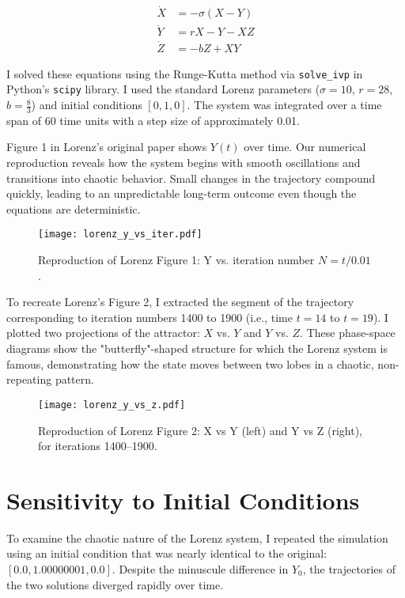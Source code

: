 \documentclass[12pt]{article}
\begin{document}
\[
\begin{aligned}
\dot{X} &= -\sigma(X - Y) \\
\dot{Y} &= rX - Y - XZ \\
\dot{Z} &= -bZ + XY
\end{aligned}
\]

I solved these equations using the Runge-Kutta method via \texttt{solve\_ivp} in Python’s \texttt{scipy} library. I used the standard Lorenz parameters (\( \sigma = 10 \), \( r = 28 \), \( b = \frac{8}{3} \)) and initial conditions \([0, 1, 0]\). The system was integrated over a time span of 60 time units with a step size of approximately 0.01.

Figure 1 in Lorenz’s original paper shows \( Y(t) \) over time. Our numerical reproduction reveals how the system begins with smooth oscillations and transitions into chaotic behavior. Small changes in the trajectory compound quickly, leading to an unpredictable long-term outcome even though the equations are deterministic.

\begin{figure}[H]
    \centering
    \texttt{[image: lorenz\_y\_vs\_iter.pdf]}
    \caption{Reproduction of Lorenz Figure 1: Y vs. iteration number \( N = t / 0.01 \).}
    \label{fig:lorenz1}
\end{figure}

To recreate Lorenz’s Figure 2, I extracted the segment of the trajectory corresponding to iteration numbers 1400 to 1900 (i.e., time \( t = 14 \) to \( t = 19 \)). I plotted two projections of the attractor: \( X \) vs. \( Y \) and \( Y \) vs. \( Z \). These phase-space diagrams show the "butterfly"-shaped structure for which the Lorenz system is famous, demonstrating how the state moves between two lobes in a chaotic, non-repeating pattern.

\begin{figure}[H]
    \centering
    \texttt{[image: lorenz\_y\_vs\_z.pdf]}
    \caption{Reproduction of Lorenz Figure 2: X vs Y (left) and Y vs Z (right), for iterations 1400–1900.}
\end{figure}

\section*{Sensitivity to Initial Conditions}

To examine the chaotic nature of the Lorenz system, I repeated the simulation using an initial condition that was nearly identical to the original: \( [0.0, 1.00000001, 0.0] \). Despite the minuscule difference in \( Y_0 \), the trajectories of the two solutions diverged rapidly over time.
\end{document}
